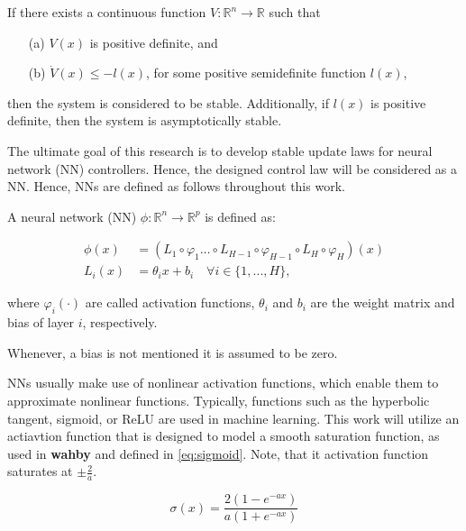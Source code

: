 \begin{definition}
    If there exists a continuous function $V: \mathbb{R}^n \rightarrow \mathbb{R}$ such that
     \begin{enumerate}
       \item[(a)] $V(x)$ is positive definite, and
       \item[(b)] $\dot{V}(x)\leq-l(x)$, for some positive semidefinite function $l(x)$,
     \end{enumerate}
    then the system is considered to be stable. Additionally, if $l(x)$ is positive definite, then the system is asymptotically stable.
     \label{def:lyapunov-stability}
\end{definition}

The ultimate goal of this research is to develop stable update laws for neural network (NN) controllers. Hence, the designed control law will be considered as a NN. Hence, NNs are defined as follows throughout this work.

\begin{definition}
    A neural network (NN) $\phi:\mathbb{R}^n\rightarrow \mathbb{R}^p$ is defined as:
   
     \begin{equation}
      \begin{aligned}
        \phi (x) & = (L_1 \circ \varphi_1 \dots \circ L_{H-1} \circ \varphi_{H-1} \circ L_{H} \circ \varphi_H)(x)\\
        L_i(x) &= \theta_i x + b_i \quad \forall i\in\{1,..., H\},
      \end{aligned}
    \end{equation}
  
     where $\varphi_i(\cdot)$ are called  activation functions, $\theta_i$ and $b_i$ are the weight matrix and bias of layer $i$, respectively.
\end{definition}
Whenever, a bias is not mentioned it is assumed to be zero.

NNs usually make use of nonlinear activation functions, which enable them to approximate nonlinear functions. Typically, functions such as the hyperbolic tangent, sigmoid, or ReLU are used in machine learning. This work will utilize an actiavtion function that is designed to model a smooth saturation function, as used in \textbf{wahby}\cite{thanhNonlinearPIDControl2006} and defined in \eqref{eq:sigmoid}. Note, that it activation function saturates at $\pm \frac{2}{a}$.

\begin{equation}
    \sigma (x) = \frac{2(1-e^{-ax})}{a(1+e^{-ax})}
    \label{eq:sigmoid}
\end{equation}

